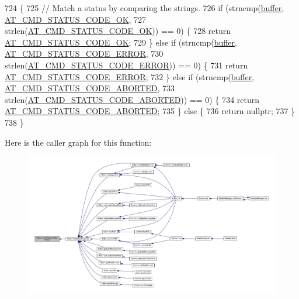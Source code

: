 \begin{DoxyCode}
724 \{
725     \textcolor{comment}{// Match a status by comparing the strings.}
726     \textcolor{keywordflow}{if} (strncmp(\hyperlink{class_u_blox_a6ca4b90f3dc4e856181dce1ebda6f82c}{buffer}, \hyperlink{_u_blox_8cpp_a6ebc1682eb6b9964fccb4a61688ff307}{AT\_CMD\_STATUS\_CODE\_OK},
727                 strlen(\hyperlink{_u_blox_8cpp_a6ebc1682eb6b9964fccb4a61688ff307}{AT\_CMD\_STATUS\_CODE\_OK})) == 0) \{
728         \textcolor{keywordflow}{return} \hyperlink{_u_blox_8cpp_a6ebc1682eb6b9964fccb4a61688ff307}{AT\_CMD\_STATUS\_CODE\_OK};
729     \} \textcolor{keywordflow}{else} \textcolor{keywordflow}{if} (strncmp(\hyperlink{class_u_blox_a6ca4b90f3dc4e856181dce1ebda6f82c}{buffer}, \hyperlink{_u_blox_8cpp_a3dd27f9d4a899cda01354d796683cf9a}{AT\_CMD\_STATUS\_CODE\_ERROR},
730                        strlen(\hyperlink{_u_blox_8cpp_a3dd27f9d4a899cda01354d796683cf9a}{AT\_CMD\_STATUS\_CODE\_ERROR})) == 0) \{
731         \textcolor{keywordflow}{return} \hyperlink{_u_blox_8cpp_a3dd27f9d4a899cda01354d796683cf9a}{AT\_CMD\_STATUS\_CODE\_ERROR};
732     \} \textcolor{keywordflow}{else} \textcolor{keywordflow}{if} (strncmp(\hyperlink{class_u_blox_a6ca4b90f3dc4e856181dce1ebda6f82c}{buffer}, \hyperlink{_u_blox_8cpp_abf37f7ed7586cdbd60130b741a4d50c5}{AT\_CMD\_STATUS\_CODE\_ABORTED},
733                        strlen(\hyperlink{_u_blox_8cpp_abf37f7ed7586cdbd60130b741a4d50c5}{AT\_CMD\_STATUS\_CODE\_ABORTED})) == 0) \{
734         \textcolor{keywordflow}{return} \hyperlink{_u_blox_8cpp_abf37f7ed7586cdbd60130b741a4d50c5}{AT\_CMD\_STATUS\_CODE\_ABORTED};
735     \} \textcolor{keywordflow}{else} \{
736         \textcolor{keywordflow}{return} \textcolor{keyword}{nullptr};
737     \}
738 \}
\end{DoxyCode}
Here is the caller graph for this function\+:
\nopagebreak
\begin{figure}[H]
\begin{center}
\leavevmode
\includegraphics[width=350pt]{da/df6/class_u_blox_aab6ad68e4c7522278f19ceab1dc2a58d_icgraph}
\end{center}
\end{figure}
\mbox{\label{class_u_blox_afc846fbcb1cbd49057b5ce39cd0e0dd6}} 
